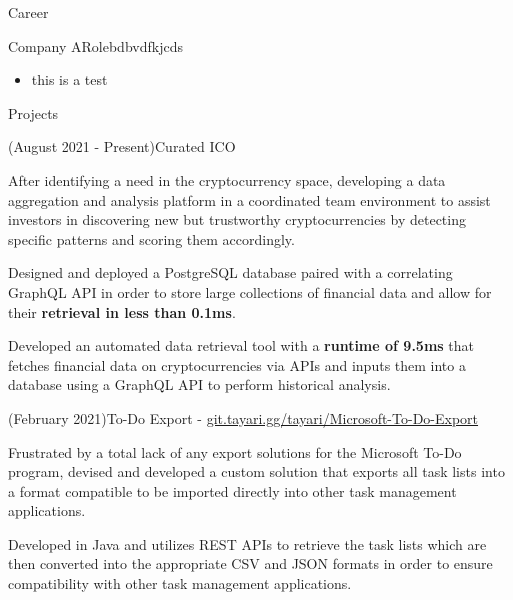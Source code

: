 \documentclass{article}
\newlength{\tabin}
\newlength{\secsep}
\newcommand{\lineunder}{\vspace*{-8pt} \\ \hspace*{-6pt} \hrulefill \\ \vspace*{-15pt}}
\newenvironment{tabbedsection}[1]{
  \begin{list}{}{
      \setlength{\itemsep}{0pt}
      \setlength{\labelsep}{0pt}
      \setlength{\labelwidth}{0pt}
      \setlength{\leftmargin}{\tabin}
      \setlength{\rightmargin}{\tabin}
      \setlength{\listparindent}{0pt}
      \setlength{\parsep}{0pt}
      \setlength{\parskip}{0pt}
      \setlength{\partopsep}{0pt}
      \setlength{\topsep}{#1}
    }
  \item[]
}{\end{list}}
\newenvironment{resume_section}[1]{
  \filbreak
  \vspace{2\secsep}
  \textsc{\color{blue}\large#1}
  \lineunder
  \begin{tabbedsection}{\secsep}
}{\end{tabbedsection}}
\newenvironment{resume_subsection}[2]{
  \textbf{\color{BlueViolet}#2} \hfill {\normalsize #1} \hspace{-5em} 
  \begin{tabbedsection}{0.5\secsep}
  \begin{subitems}
}{\end{subitems}\end{tabbedsection}}
\newenvironment{subitems}{
  \renewcommand{\labelitemi}{-}
  \begin{itemize}
      \setlength{\labelsep}{1em}
}{\end{itemize}}
\newenvironment{resume_employer}[4]{
  \vspace{\secsep}
  \textbf{#1} \\ 
  \indent {\normalsize #2} \hfill {\normalsize #3 (#4)}
  \begin{tabbedsection}{0pt}
  \begin{subitems}
}{\end{subitems}\end{tabbedsection}}
\begin{document}
\vspace{2\secsep}
\begin{resume_section}{Career}
\begin{resume_employer}{Company A}{Role}{bdbvdfkjcds}
    \begin{subitems}
        \item this is a test
    \end{subitems}
\end{resume_employer}
\end{resume_section}


\vspace{2\secsep}

\begin{resume_section}{Projects}
	\begin{resume_subsection}{(August 2021 - Present)}{Curated ICO}
        \item After identifying a need in the cryptocurrency space, developing a data aggregation and analysis platform in a coordinated team environment to assist investors in discovering new but trustworthy cryptocurrencies by detecting specific patterns and scoring them accordingly.
        \item Designed and deployed a PostgreSQL database paired with a correlating GraphQL API in order to store large collections of financial data and allow for their \textbf{retrieval in less than 0.1ms}. 
        \item Developed an automated data retrieval tool with a \textbf{runtime of 9.5ms} that fetches financial data on cryptocurrencies via APIs and inputs them into a database using a GraphQL API to perform historical analysis. 
	\end{resume_subsection}
	\vspace{2\secsep}
	\begin{resume_subsection}{(February 2021)}{To-Do Export - \faGitlab \hspace{0.01cm} \href{https://git.tayari.gg/tayari/Microsoft-To-Do-Export}{git.tayari.gg/tayari/Microsoft-To-Do-Export}}
        \item Frustrated by a total lack of any export solutions for the Microsoft To-Do program, devised and developed a custom solution that exports all task lists into a format compatible to be imported directly into other task management applications.
  		\item Developed in Java and utilizes REST APIs to retrieve the task lists which are then converted into the appropriate CSV and JSON formats in order to ensure compatibility with other task management applications.

\end{resume_subsection}
\end{resume_section}
\end{document}
